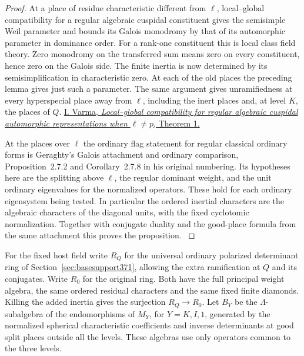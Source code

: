 \documentclass[a4paper,11pt]{article}
\theoremstyle{definition}
\theoremstyle{remark}
\numberwithin{equation}{section}
\begin{document}
\begin{proof}
At a place of residue characteristic different from \(\ell\),
local--global compatibility for a regular algebraic cuspidal
constituent gives the semisimple Weil parameter and bounds
its Galois monodromy by that of its automorphic parameter
in dominance order. For a rank-one constituent this is local
class field theory. Zero monodromy on the transferred sum
means zero on every constituent, hence zero on the Galois
side. The finite inertia is now determined by its
semisimplification in characteristic zero. At each of the
old places the preceding lemma gives just such a parameter.
The same argument gives unramifiedness at every hyperspecial
place away from \(\ell\), including the inert places and,
at level \(K\), the places of \(Q\).
\href{https://www.math.toronto.edu/~ila/lgellneqp7}{I. Varma,
\emph{Local--global compatibility for regular algebraic
cuspidal automorphic representations when \(\ell\ne p\)},
Theorem 1.}

At the places over \(\ell\) the ordinary flag statement for
regular classical ordinary forms is Geraghty's Galois
attachment and ordinary comparison, Proposition~2.7.2 and
Corollary~2.7.8 in his original numbering. Its hypotheses
here are the splitting above \(\ell\), the regular dominant
weight, and the unit ordinary eigenvalues for the normalized
operators. These hold for each ordinary eigensystem being
tested. In particular the ordered inertial characters are
the algebraic characters of the diagonal units, with the
fixed cyclotomic normalization. Together with conjugate
duality and the good-place formula from the same attachment
this proves the proposition. \cite{VIII-VI-geraghty363}
\end{proof}

For the fixed host field write \(R_Q\) for the universal
ordinary polarized determinant ring of
Section~\ref{sec:basesupport371}, allowing the extra
ramification at \(Q\) and its conjugates. Write \(R_0\)
for the original ring. Both have the full principal weight
algebra, the same ordered residual characters and the same
fixed finite diamonds. Killing the added inertia gives the
surjection \(R_Q\to R_0\). Let \(B_Y\) be the \(\Lambda\)-subalgebra
of the endomorphisms of \(M_Y\), for \(Y=K,I,1\), generated
by the normalized spherical characteristic coefficients and
inverse determinants at good split places outside all the
levels. These algebras use only operators common to the
three levels.
\end{document}
